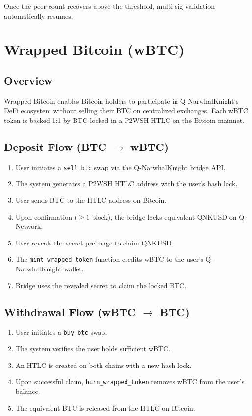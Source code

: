\documentclass[11pt,a4paper]{article}
\begin{document}
Once the peer count recovers above the threshold, multi-sig validation automatically resumes.

\section{Wrapped Bitcoin (wBTC)}
\label{sec:wbtc}

\subsection{Overview}

Wrapped Bitcoin enables Bitcoin holders to participate in Q-NarwhalKnight's DeFi ecosystem without selling their BTC on centralized exchanges. Each wBTC token is backed 1:1 by BTC locked in a P2WSH HTLC on the Bitcoin mainnet.

\subsection{Deposit Flow (BTC $\rightarrow$ wBTC)}

\begin{enumerate}
    \item User initiates a \texttt{sell\_btc} swap via the Q-NarwhalKnight bridge API.
    \item The system generates a P2WSH HTLC address with the user's hash lock.
    \item User sends BTC to the HTLC address on Bitcoin.
    \item Upon confirmation ($\geq 1$ block), the bridge locks equivalent QNKUSD on Q-Network.
    \item User reveals the secret preimage to claim QNKUSD.
    \item The \texttt{mint\_wrapped\_token} function credits wBTC to the user's Q-NarwhalKnight wallet.
    \item Bridge uses the revealed secret to claim the locked BTC.
\end{enumerate}

\subsection{Withdrawal Flow (wBTC $\rightarrow$ BTC)}

\begin{enumerate}
    \item User initiates a \texttt{buy\_btc} swap.
    \item The system verifies the user holds sufficient wBTC.
    \item An HTLC is created on both chains with a new hash lock.
    \item Upon successful claim, \texttt{burn\_wrapped\_token} removes wBTC from the user's balance.
    \item The equivalent BTC is released from the HTLC on Bitcoin.
\end{enumerate}
\end{document}
